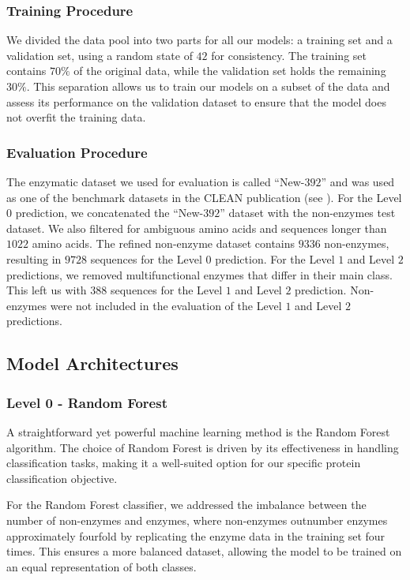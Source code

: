 \documentclass{bioinfo}
\begin{document}
\begin{methods}
\subsubsection{Training Procedure}
We divided the data pool into two parts for all our models: a training set and a validation set, using a random state of $42$ for consistency. 
The training set contains $70\%$ of the original data, while the validation set holds the remaining $30\%$. 
This separation allows us to train our models on a subset of the data and assess its performance on 
the validation dataset to ensure that the model does not overfit the training data.

\subsubsection{Evaluation Procedure}
The enzymatic dataset we used for evaluation is called ``New-$392$'' and was used as one of the benchmark datasets 
in the CLEAN publication (see \cite{CleanArticle}).
For the Level $0$ prediction, we concatenated the ``New-$392$'' dataset with the non-enzymes test dataset.
We also filtered for ambiguous amino acids and sequences longer than $1022$ amino acids.
The refined non-enzyme dataset contains $9336$ non-enzymes, resulting in $9728$ sequences for the Level $0$ prediction.
For the Level $1$ and Level $2$ predictions, we removed multifunctional enzymes that differ in their main class.
This left us with $388$ sequences for the Level $1$ and Level $2$ prediction.
Non-enzymes were not included in the evaluation of the Level $1$ and Level $2$ predictions.

\subsection{Model Architectures}
\subsubsection{Level 0 - Random Forest}
A straightforward yet powerful machine learning method is the Random
Forest algorithm. The choice of Random Forest is driven by its
effectiveness in handling classification tasks, making it a well-suited
option for our specific protein classification objective. 

For the Random Forest classifier, we addressed the imbalance between the number of non-enzymes and enzymes, 
where non-enzymes outnumber enzymes approximately
fourfold by replicating the enzyme data in the training set four times.
This ensures a more balanced dataset, allowing the model to
be trained on an equal representation of both classes.


\end{methods}
\end{document}
